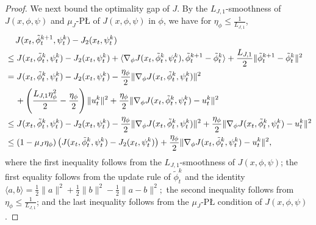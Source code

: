 \documentclass{article}
\theoremstyle{plain}
\theoremstyle{definition}
\theoremstyle{remark}
\begin{document}
\begin{proof}
    We next bound the optimality gap of $J$. By the $L_{J,1}$-smoothness of $J(x,\phi,\psi)$ and $\mu_J$-P{\L} of $J(x,\phi,\psi)$ in $\phi$, we have for $\eta_\phi \leq \frac{1}{L_{J,1}}$,
    \begin{align}
        & \quad \, J(x_t,\tilde{\phi}_t^{k+1},\psi_t^k) - J_2(x_t,\psi_t^{k}) \notag \\
        & \leq J(x_t,\tilde{\phi}_t^{k},\psi_t^k) - J_2(x_t,\psi_t^{k}) + \langle \nabla_\phi J(x_t,\tilde{\phi}_t^{k},\psi_t^k), \tilde{\phi}_t^{k+1} - \tilde{\phi}_t^k  \rangle + \frac{L_{J,1}}{2} \| \tilde{\phi}_t^{k+1} - \tilde{\phi}_t^k \|^2 \notag \\
        & = J(x_t,\tilde{\phi}_t^{k},\psi_t^k)  - J_2(x_t,\psi_t^{k}) - \frac{\eta_\phi}{2} \|  \nabla_\phi J(x_t,\tilde{\phi}_t^{k},\psi_t^k)\|^2 \notag \\
        & \quad \, + \left(\frac{L_{J,1}\eta_\phi^2 }{2} - \frac{\eta_\phi}{2}\right) \|u_t^k \|^2 + \frac{\eta_\phi}{2} \|\nabla_\phi J(x_t,\tilde{\phi}_t^{k},\psi_t^k) - u_t^k\|^2 \notag\\
        & \leq J(x_t,\tilde{\phi}_t^{k},\psi_t^k) - J_2(x_t,\psi_t^{k}) - \frac{\eta_\phi}{2} \|  \nabla_\phi J(x_t,\tilde{\phi}_t^{k},\psi_t^k)\|^2 + \frac{\eta_\phi}{2} \| \nabla_\phi J(x_t,\tilde{\phi}_t^{k},\psi_t^k) - u_t^k\|^2 \notag\\
        & \leq \left(1 - \mu_J \eta_\phi \right) \left(J(x_t,\tilde{\phi}_t^{k},\psi_t^k) - J_2(x_t,\psi_t^k)\right) + \frac{\eta_\phi}{2} \| \nabla_\phi J(x_t,\tilde{\phi}_t^{k},\psi_t^k) - u_t^k\|^2, \label{eq: stochastic-descent-lemma-J-phi-large-batch}
    \end{align}
    where the first inequality follows from the $L_{J,1}$-smoothness of $J(x,\phi,\psi)$; the first equality follows from the update rule of $\tilde{\phi}_t^k$ and the identity
\(
\langle a,b\rangle = \tfrac{1}{2}\|a\|^2 + \tfrac{1}{2}\|b\|^2 - \tfrac{1}{2}\|a-b\|^2;
\)
the second inequality follows from $\eta_\phi \le \tfrac{1}{L_{J,1}}$; and the last inequality follows from the $\mu_J$-P{\L} condition of $J(x,\phi,\psi)$. 




\end{proof}
\end{document}
